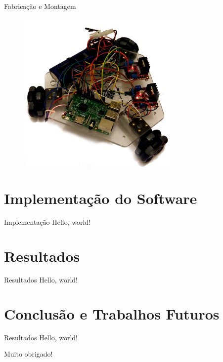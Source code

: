 \documentclass{beamer}
\begin{document}
\begin{frame}{Fabricação e Montagem}
  \begin{figure}[h]
    \centering
    \includegraphics[width = 0.7\textwidth]{imagens/roboto}
  \end{figure}
  \addtocounter{framenumber}{-1}
\end{frame}

\section{Implementação do Software}
\begin{frame}{Implementação}
  Hello, world!
\end{frame}

\section{Resultados}
\begin{frame}{Resultados}
  Hello, world!
\end{frame}

\section{Conclusão e Trabalhos Futuros}
\begin{frame}{Resultados}
  Hello, world!
\end{frame}

\begin{frame}
  Muito obrigado!
\end{frame}
\end{document}
